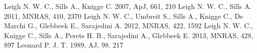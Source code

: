 \documentclass{aastex62}
\begin{document}
\begin{thebibliography}{}
 Leigh
  N. W. C., Sills A., Knigge C. 2007, ApJ, 661, 210
 Leigh N. W. C., Sills A. 2011, MNRAS, 410, 2370
 Leigh N. W. C., Umbreit S.,
Sills A., Knigge C., De Marchi G., Glebbeek E., Sarajedini A. 2012, MNRAS, 422, 1592
 Leigh N. W. C., Knigge C.,
Sills A., Perets H. B., Sarajedini A., Glebbeek E. 2013, MNRAS, 428, 897
 Leonard
  P. J. T. 1989, AJ, 98, 217

\end{thebibliography}
\end{document}
